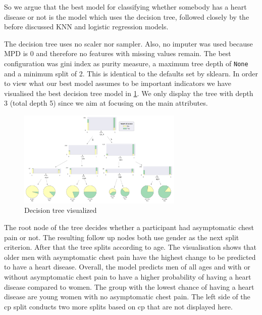 So we argue that the best model for classifying whether somebody has a heart disease or not is the model which uses the decision tree, followed closely by the before discussed KNN and logistic regression models.


The decision tree uses no scaler nor sampler. Also, no imputer was used because MPD is 0 and therefore no features with missing values remain. The best configuration was gini index as purity measure, a maximum tree depth of \texttt{None} and a minimum split of 2. This is identical to the defaults set by sklearn. 
In order to view what our best model assumes to be important indicators we have visualised the best decision tree model in \cref{fig:DecisionTree}. We only display the tree with depth 3 (total depth 5) since we aim at focusing on the main attributes. 
\begin{figure}[h]
	\centering
	\includegraphics[width=0.7\textwidth]{images/DecisionTree.png}
	\caption{Decision tree visualized}
	\label{fig:DecisionTree}
\end{figure}

The root node of the tree decides whether a participant had asymptomatic chest pain or not. The resulting follow up nodes both use gender as the next split criterion. After that the tree splits according to age. The visualisation shows that older men with asymptomatic chest pain have the highest change to be predicted to have a heart disease. Overall, the model predicts men of all ages and with or without asymptomatic chest pain to have a higher probability of having a heart disease compared to women. The group with the lowest chance of having a heart disease are young women with no asymptomatic chest pain. The left side of the cp split conducts two more splits based on cp that are not displayed here. 